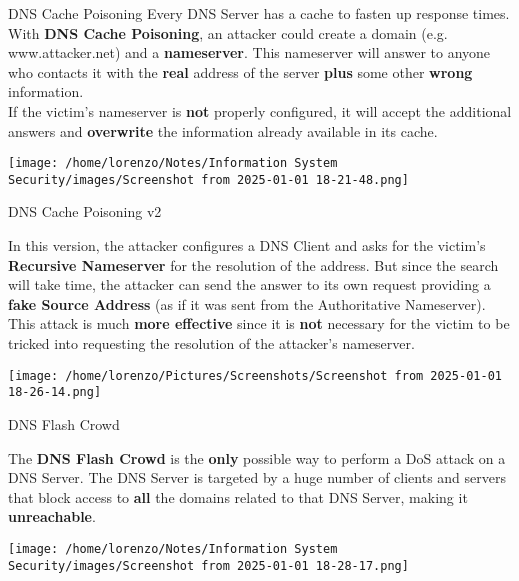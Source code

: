 \begin{center}
   
    \begin{quotebox-grey}{DNS Cache Poisoning}
        Every DNS Server has a cache to fasten up response times. With \textbf{DNS Cache Poisoning}, an
        attacker could create a domain (e.g. www.attacker.net) and a \textbf{nameserver}. This nameserver
        will answer to anyone who contacts it with the \textbf{real} address of the server \textbf{plus} some other \textbf{wrong} information.
        \\
        If the victim’s nameserver is \textbf{not} properly configured, it will accept the additional answers and \textbf{overwrite} the information already available in its cache.

            \centering
            \texttt{[image: /home/lorenzo/Notes/Information System Security/images/Screenshot from 2025-01-01 18-21-48.png]}
    \end{quotebox-grey}
\end{center}
\begin{quotebox-grey}{DNS Cache Poisoning v2}
    \begin{minipage}{0.6\textwidth}
    \vspace{-0.5cm}
    In this version, the attacker configures a DNS Client and asks for the victim’s \textbf{Recursive
    Nameserver} for the resolution of the address. But since the search will take time, the attacker
    can send the answer to its own request providing a \textbf{fake Source Address} (as if it was sent
    from the Authoritative Nameserver).\\
    This attack is much \textbf{more effective} since it is \textbf{not} necessary for the victim to be tricked into requesting the resolution of the attacker’s nameserver. 
    \end{minipage} 
    \hspace{0.3cm}
    \begin{minipage}{0.4\textwidth}
        
        \texttt{[image: /home/lorenzo/Pictures/Screenshots/Screenshot from 2025-01-01 18-26-14.png]}
    \end{minipage}
\end{quotebox-grey}
\begin{quotebox-grey}{DNS Flash Crowd}
    \begin{minipage}{0.6\textwidth}
    \vspace{-2cm}
    The \textbf{DNS Flash Crowd} is the \textbf{only} possible way to perform a DoS attack on a DNS Server.
    The DNS Server is targeted by a huge number of clients and servers that block access to \textbf{all}
    the domains related to that DNS Server, making it \textbf{unreachable}. 
    \end{minipage} 
    \hspace{0.3cm}
    \begin{minipage}{0.4\textwidth}
        \centering
        \texttt{[image: /home/lorenzo/Notes/Information System Security/images/Screenshot from 2025-01-01 18-28-17.png]}
    \end{minipage}
\end{quotebox-grey}

